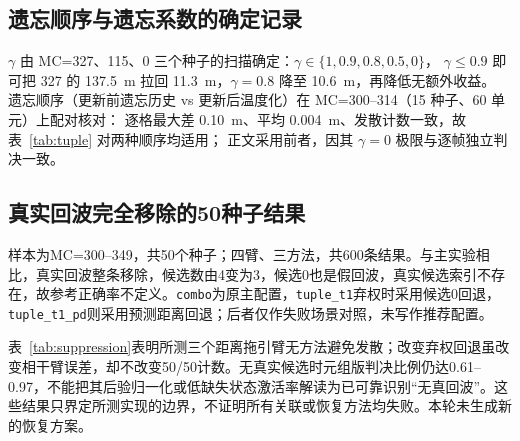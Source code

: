 \documentclass[UTF8,a4paper,zihao=-4]{ctexart}
\begin{document}
\subsection{遗忘顺序与遗忘系数的确定记录}\label{sup:forget-audit}

$\gamma$ 由 MC=327、115、0 三个种子的扫描确定：$\gamma\in\{1,0.9,0.8,0.5,0\}$，
$\gamma\le0.9$ 即可把 327 的 137.5~m 拉回 11.3~m，$\gamma=0.8$ 降至 10.6~m，再降低无额外收益。
遗忘顺序（更新前遗忘历史 vs 更新后温度化）在 MC=300--314（15 种子、60 单元）上配对核对：
逐格最大差 0.10~m、平均 0.004~m、发散计数一致，故表~\ref{tab:tuple} 对两种顺序均适用；
正文采用前者，因其 $\gamma=0$ 极限与逐帧独立判决一致。

\subsection{真实回波完全移除的50种子结果}\label{sup:suppression-audit}

样本为MC=300--349，共50个种子；四臂、三方法，共600条结果。与主实验相比，真实回波整条移除，候选数由4变为3，候选0也是假回波，真实候选索引不存在，故参考正确率不定义。\texttt{combo}为原主配置，\texttt{tuple\_t1}弃权时采用候选0回退，\texttt{tuple\_t1\_pd}则采用预测距离回退；后者仅作失败场景对照，未写作推荐配置。

\begin{table}[htbp]
\centering\small
\caption{真实回波移除压力测试（MC=300--349；位置RMSE，m；前三列为均值/中位/p90；发散判据为RMSE大于50 m；末列为元组版起点后的判决帧比例均值）}\label{tab:suppression}
\end{table}

表~\ref{tab:suppression}表明所测三个距离拖引臂无方法避免发散；改变弃权回退虽改变相干臂误差，却不改变50/50计数。无真实候选时元组版判决比例仍达0.61--0.97，不能把其后验归一化或低缺失状态激活率解读为已可靠识别“无真回波”。这些结果只界定所测实现的边界，不证明所有关联或恢复方法均失败。本轮未生成新的恢复方案。
\end{document}
